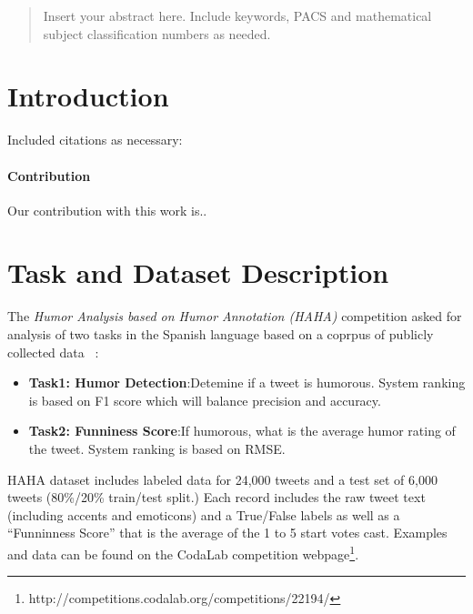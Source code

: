 \date{Received: 15 June 2019 / Accepted: date}


\maketitle

\begin{abstract}
Insert your abstract here. Include keywords, PACS and mathematical
subject classification numbers as needed.
\end{abstract}

\section{Introduction}
\label{intro}
Included citations as necessary: ~\cite{Nobody06}
\paragraph{Contribution} Our contribution with this work is..

\section{Task and Dataset Description}
\label{sec:task}
The \textit{Humor Analysis based on Humor Annotation (HAHA)} competition asked for analysis of two tasks in the Spanish language based on a coprpus of publicly collected data ~\cite{castro2018crowd}:
\begin{itemize}
\item \textbf{Task1: Humor Detection}:Detemine if a tweet is humorous. System ranking is based on F1 score which will balance precision and accuracy.
\item \textbf{Task2: Funniness Score}:If humorous, what is the average humor rating of the tweet. System ranking is based on RMSE.
\end{itemize}
HAHA dataset includes labeled data for 24,000 tweets and a test set of 6,000 tweets (80\%/20\% train/test split.)  Each record includes the raw tweet text (including accents and emoticons) and a True/False labels as well as a ``Funninness Score'' that is the average of the 1 to 5 start votes cast.  Examples and data can be found on the CodaLab competition webpage\footnote{http://competitions.codalab.org/competitions/22194/}.

